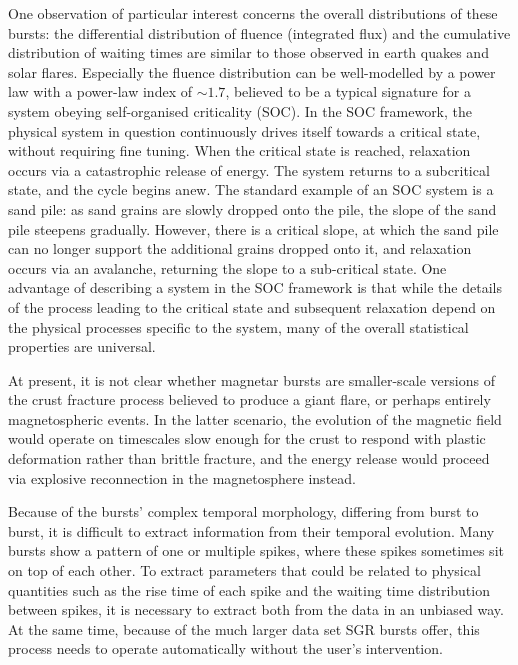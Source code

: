 \documentclass[12pt]{article}
\begin{document}
One observation of particular interest concerns the overall distributions of these bursts: the differential distribution of fluence (integrated flux) and 
the cumulative distribution of waiting times are similar to those observed in earth quakes and solar flares. Especially the fluence distribution
can be well-modelled by a power law with a power-law index of $\sim 1.7$, believed to be a typical signature for a system obeying 
self-organised criticality (SOC). In the SOC framework, the physical system in question continuously drives itself towards a critical state,
without requiring fine tuning. When the critical state is reached, relaxation occurs via a catastrophic release of energy. The system returns
to a subcritical state, and the cycle begins anew. The standard example of an SOC system is a sand pile: as sand grains are slowly dropped onto
the pile, the slope of the sand pile steepens gradually. However, there is a critical slope, at which the sand pile can no longer support the 
additional grains dropped onto it, and relaxation occurs via an avalanche, returning the slope to a sub-critical state. 
One advantage of describing a system in the SOC framework is that while the details of the process leading to the critical state and subsequent
relaxation depend on the physical processes specific to the system, many of the overall statistical properties are universal.


At present, it is not clear whether magnetar bursts are smaller-scale versions of the crust fracture process believed to produce a giant flare,
or perhaps entirely magnetospheric events. In the latter scenario, the evolution of the magnetic field would operate on timescales
slow enough for the crust to respond with plastic deformation rather than brittle fracture, and the energy release would proceed via
explosive reconnection in the magnetosphere instead.


Because of the bursts' complex temporal morphology, differing from burst to burst, it is difficult to extract information from their temporal evolution. 
Many bursts show a pattern of one or multiple spikes, where these spikes sometimes sit on top of each other. To extract parameters that could be related
to physical quantities such as the rise time of each spike and the waiting time distribution between spikes, it is necessary to 
extract both from the data in an unbiased way. At the same time, because of the much larger data set SGR bursts offer, this process
needs to operate automatically without the user's intervention.
\end{document}
